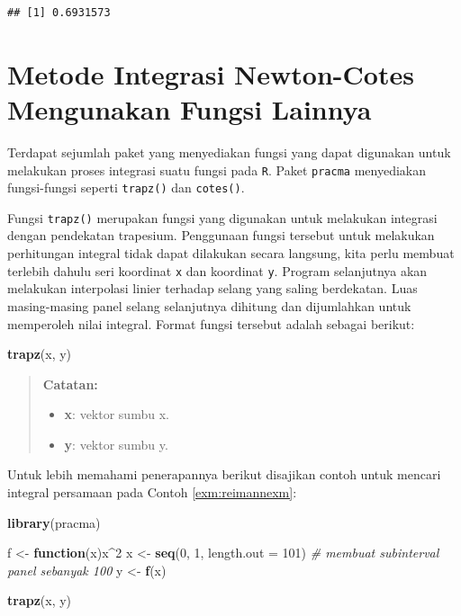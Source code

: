 \documentclass[]{book}
\newenvironment{Shaded}{\begin{snugshade}}{\end{snugshade}}
\newcommand{\CommentTok}[1]{\textcolor[rgb]{0.56,0.35,0.01}{\textit{#1}}}
\newcommand{\ControlFlowTok}[1]{\textcolor[rgb]{0.13,0.29,0.53}{\textbf{#1}}}
\newcommand{\DataTypeTok}[1]{\textcolor[rgb]{0.13,0.29,0.53}{#1}}
\newcommand{\DecValTok}[1]{\textcolor[rgb]{0.00,0.00,0.81}{#1}}
\newcommand{\KeywordTok}[1]{\textcolor[rgb]{0.13,0.29,0.53}{\textbf{#1}}}
\newcommand{\NormalTok}[1]{#1}
\newcommand{\OperatorTok}[1]{\textcolor[rgb]{0.81,0.36,0.00}{\textbf{#1}}}
\newcommand{\StringTok}[1]{\textcolor[rgb]{0.31,0.60,0.02}{#1}}
\providecommand{\tightlist}{%
  \setlength{\itemsep}{0pt}\setlength{\parskip}{0pt}}
\theoremstyle{definition}
\theoremstyle{definition}
\theoremstyle{definition}
\theoremstyle{remark}
\begin{document}
\begin{verbatim}
## [1] 0.6931573
\end{verbatim}

\hypertarget{metode-integrasi-newton-cotes-mengunakan-fungsi-lainnya}{%
\section{Metode Integrasi Newton-Cotes Mengunakan Fungsi Lainnya}\label{metode-integrasi-newton-cotes-mengunakan-fungsi-lainnya}}

Terdapat sejumlah paket yang menyediakan fungsi yang dapat digunakan untuk melakukan proses integrasi suatu fungsi pada \texttt{R}. Paket \texttt{pracma} menyediakan fungsi-fungsi seperti \texttt{trapz()} dan \texttt{cotes()}.

Fungsi \texttt{trapz()} merupakan fungsi yang digunakan untuk melakukan integrasi dengan pendekatan trapesium. Penggunaan fungsi tersebut untuk melakukan perhitungan integral tidak dapat dilakukan secara langsung, kita perlu membuat terlebih dahulu seri koordinat \texttt{x} dan koordinat \texttt{y}. Program selanjutnya akan melakukan interpolasi linier terhadap selang yang saling berdekatan. Luas masing-masing panel selang selanjutnya dihitung dan dijumlahkan untuk memperoleh nilai integral. Format fungsi tersebut adalah sebagai berikut:

\begin{Shaded}
\begin{Highlighting}[]
\KeywordTok{trapz}\NormalTok{(x, y)}
\end{Highlighting}
\end{Shaded}

\begin{quote}
\textbf{Catatan:}

\begin{itemize}
\tightlist
\item
  \textbf{x}: vektor sumbu x.
\item
  \textbf{y}: vektor sumbu y.
\end{itemize}
\end{quote}

Untuk lebih memahami penerapannya berikut disajikan contoh untuk mencari integral persamaan pada Contoh \ref{exm:reimannexm}:

\begin{Shaded}
\begin{Highlighting}[]
\KeywordTok{library}\NormalTok{(pracma)}

\NormalTok{f <-}\StringTok{ }\ControlFlowTok{function}\NormalTok{(x)x}\OperatorTok{^}\DecValTok{2}
\NormalTok{x <-}\StringTok{ }\KeywordTok{seq}\NormalTok{(}\DecValTok{0}\NormalTok{, }\DecValTok{1}\NormalTok{, }\DataTypeTok{length.out =} \DecValTok{101}\NormalTok{) }\CommentTok{# membuat subinterval panel sebanyak 100}
\NormalTok{y <-}\StringTok{ }\KeywordTok{f}\NormalTok{(x)}

\KeywordTok{trapz}\NormalTok{(x, y)}
\end{Highlighting}
\end{Shaded}
\end{document}
